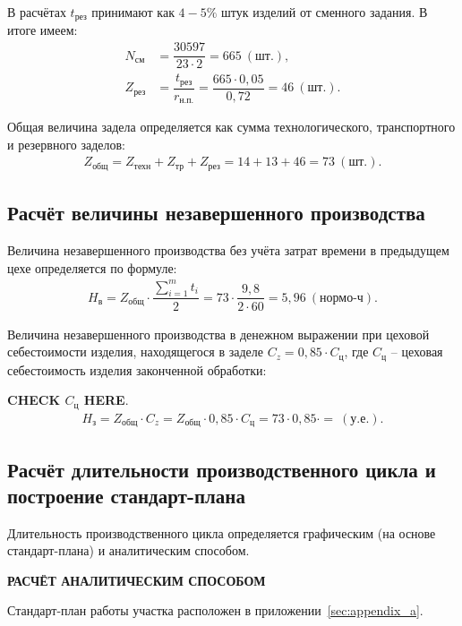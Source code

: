 В расчётах $ t_{\text{рез}} $ принимают как $ 4 - 5\% $ штук изделий от сменного
задания. В итоге имеем:
\begin{align*}
  N_{\text{см}} &= \dfrac{30597}{23 \cdot 2} = 665~(\text{шт.}), \\
  Z_{\text{рез}} &= \dfrac{t_{\text{рез}}}{r_{\text{н.п.}}} = \dfrac{665 \cdot 0{,}05}{0{,}72} = 46~(\text{шт.}).
\end{align*}

Общая величина задела определяется как сумма технологического, транспортного и
резервного заделов:
\begin{align*}
  Z_{\text{общ}} = Z_{\text{техн}} + Z_{\text{тр}} + Z_{\text{рез}} = 14 + 13 + 46 = 73~(\text{шт.}).
\end{align*}


\subsection{Расчёт величины незавершенного производства}

Величина незавершенного производства без учёта затрат времени в предыдущем цехе
определяется по формуле:
\begin{align*}
  H_{\text{в}} = Z_{\text{общ}} \cdot \dfrac{\sum\limits_{i=1}^m t_i}{2} = 73 \cdot \dfrac{9{,}8}{2 \cdot 60} = 5{,}96~(\text{нормо-ч}).
\end{align*}

Величина незавершенного производства в денежном выражении при цеховой себестоимости
изделия, находящегося в заделе $C_z = 0{,}85 \cdot C_{\text{ц}}$,
где $ C_{\text{ц}} $ -- цеховая себестоимость изделия законченной обработки:

\textbf{CHECK $C_{\text{ц}}$ HERE}.
\begin{align*}
  H_{\text{з}} = Z_{\text{общ}} \cdot C_z = Z_{\text{общ}} \cdot 0{,}85 \cdot C_{\text{ц}} = 73 \cdot 0{,}85 \cdot = ~(\text{у.е.}).
\end{align*}

\subsection{Расчёт длительности производственного цикла и построение стандарт-плана}

Длительность производственного цикла определяется графическим (на основе
стандарт-плана) и аналитическим способом.

\textbf{РАСЧЁТ АНАЛИТИЧЕСКИМ СПОСОБОМ}

Стандарт-план работы участка расположен в приложении~\ref{sec:appendix_a}.
